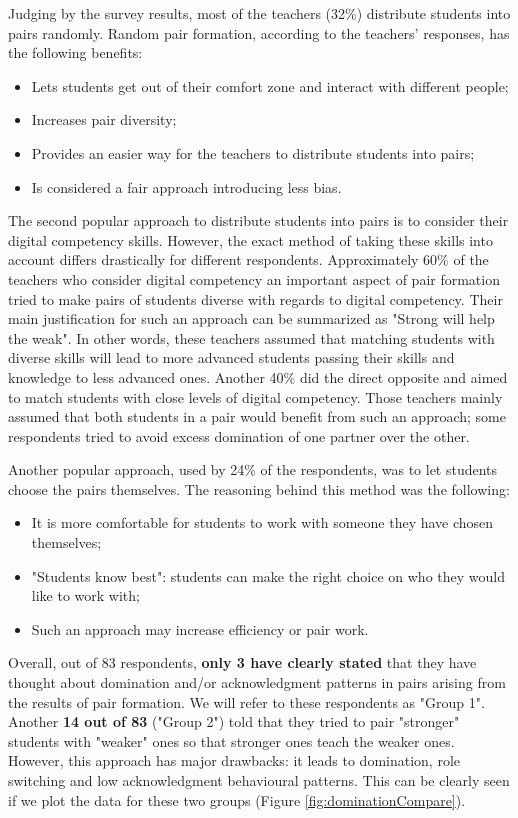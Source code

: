 \documentclass[conference]{IEEEtran}
\begin{document}
Judging by the survey results, most of the teachers (32\%) distribute students into pairs randomly. Random pair formation, according to the teachers' responses, has the following benefits:

\begin{itemize}
    \item Lets students get out of their comfort zone and interact with different people;
    \item Increases pair diversity;
    \item Provides an easier way for the teachers to distribute students into pairs;
    \item Is considered a fair approach introducing less bias.
\end {itemize}

The second popular approach to distribute students into pairs is to consider their digital competency skills. However, the exact method of taking these skills into account differs drastically for different respondents. Approximately 60\% of the teachers who consider digital competency an important aspect of pair formation tried to make pairs of students diverse with regards to digital competency. Their main justification for such an approach can be summarized as "Strong will help the weak". In other words, these teachers assumed that matching students with diverse skills will lead to more advanced students passing their skills and knowledge to less advanced ones. Another 40\% did the direct opposite and aimed to match students with close levels of digital competency. Those teachers mainly assumed that both students in a pair would benefit from such an approach; some respondents tried to avoid excess domination of one partner over the other.

Another popular approach, used by 24\% of the respondents, was to let students choose the pairs themselves. The reasoning behind this method was the following:
\begin{itemize}
    \item It is more comfortable for students to work with someone they have chosen themselves;
    \item "Students know best": students can make the right choice on who they would like to work with;
    \item Such an approach may increase efficiency or pair work.
\end{itemize}

Overall, out of 83 respondents, \textbf{only 3 have clearly stated} that they have thought about domination and/or acknowledgment patterns in pairs arising from the results of pair formation. We will refer to these respondents as "Group 1". Another \textbf{14 out of 83} ("Group 2") told that they tried to pair "stronger" students with "weaker" ones so that stronger ones teach the weaker ones. However, this approach has major drawbacks: it leads to domination, role switching and low acknowledgment behavioural patterns. This can be clearly seen if we plot the data for these two groups (Figure \ref{fig:dominationCompare}).
\end{document}
